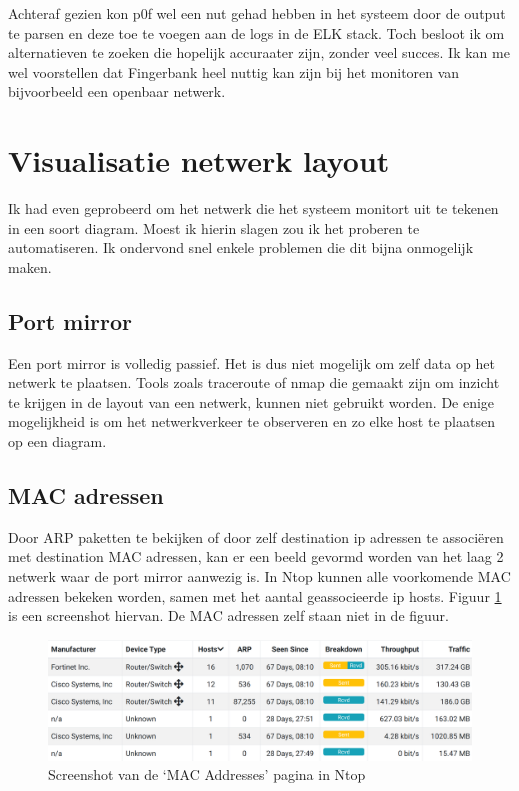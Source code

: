 \documentclass[a4paper,12pt]{report}
\begin{document}
Achteraf gezien kon p0f wel een nut gehad hebben in het systeem door de output te parsen en deze toe te voegen aan de logs in de ELK stack.
Toch besloot ik om alternatieven te zoeken die hopelijk accuraater zijn, zonder veel succes.
Ik kan me wel voorstellen dat Fingerbank heel nuttig kan zijn bij het monitoren van bijvoorbeeld een openbaar netwerk.

\section{Visualisatie netwerk layout}
Ik had even geprobeerd om het netwerk die het systeem monitort uit te tekenen in een soort diagram.
Moest ik hierin slagen zou ik het proberen te automatiseren.
Ik ondervond snel enkele problemen die dit bijna onmogelijk maken.

\subsection{Port mirror}
Een port mirror is volledig passief.
Het is dus niet mogelijk om zelf data op het netwerk te plaatsen.
Tools zoals traceroute of nmap die gemaakt zijn om inzicht te krijgen in de layout van een netwerk, kunnen niet gebruikt worden.
De enige mogelijkheid is om het netwerkverkeer te observeren en zo elke host te plaatsen op een diagram.

\subsection{MAC adressen}
Door ARP paketten te bekijken of door zelf destination ip adressen te associëren met destination MAC adressen, kan er een beeld gevormd worden van het laag 2 netwerk waar de port mirror aanwezig is.
In Ntop kunnen alle voorkomende MAC adressen bekeken worden, samen met het aantal geassocieerde ip hosts.
Figuur \ref{fig:visualisatie-netwerk-layout-ntop-mac} is een screenshot hiervan.
De MAC adressen zelf staan niet in de figuur.

\begin{figure}[H]
  \centering
  \includegraphics[width=\textwidth]{visualisatie-netwerk-layout-ntop-mac}
  \caption{Screenshot van de `MAC Addresses' pagina in Ntop}
  \label{fig:visualisatie-netwerk-layout-ntop-mac}
\end{figure}
\end{document}
